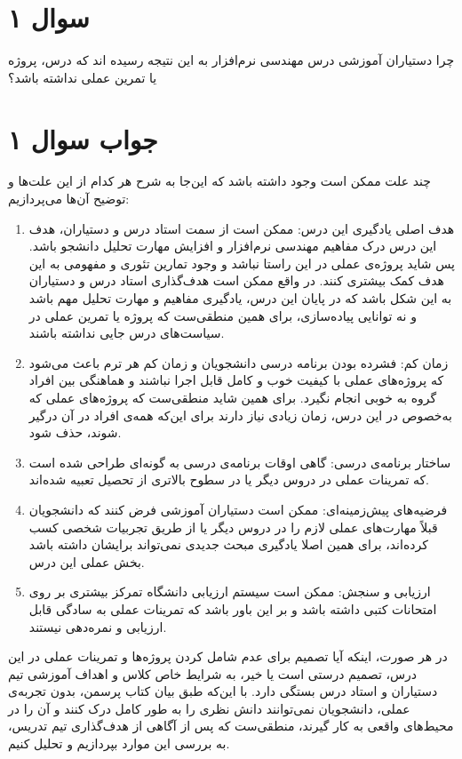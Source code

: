 \section*{سوال ۱}

چرا دستیاران آموزشی درس مهندسی نرم‌افزار به این نتیجه رسیده اند که درس، پروژه یا تمرین عملی نداشته باشد؟
\section*{جواب سوال ۱}

چند علت ممکن است وجود داشته باشد که این‌جا به شرح هر کدام از این علت‌ها و توضیح آن‌ها می‌پردازیم:

\begin{enumerate}
	\item هدف اصلی یادگیری این درس: ممکن است از سمت استاد درس و دستیاران، هدف این درس درک مفاهیم مهندسی نرم‌افزار و افزایش مهارت تحلیل دانشجو باشد. پس شاید پروژه‌ی عملی در این راستا نباشد و وجود تمارین تئوری و مفهومی به این هدف کمک بیشتری کنند. در واقع ممکن است هدف‌گذاری استاد درس و دستیاران به این شکل باشد که در پایان این درس، یادگیری مفاهیم و مهارت تحلیل مهم باشد و نه توانایی پیاده‌سازی، برای همین منطقی‌ست که پروژه یا تمرین عملی در سیاست‌های درس جایی نداشته باشند.
	
	\item زمان کم: فشرده بودن برنامه درسی دانشجویان و زمان کم هر ترم باعث می‌شود که پروژه‌های عملی با کیفیت خوب و کامل قابل اجرا نباشند و هماهنگی بین افراد گروه به خوبی انجام نگیرد. برای همین شاید منطقی‌ست که پروژه‌های عملی که به‌خصوص در این درس، زمان زیادی نیاز دارند برای این‌که همه‌ی افراد در آن درگیر شوند، حذف شود.
	
	\item ساختار برنامه‌ی درسی: گاهی اوقات برنامه‌ی درسی به گونه‌ای طراحی شده است که تمرینات عملی در دروس دیگر یا در سطوح بالاتری از تحصیل تعبیه شده‌اند.
	
	\item فرضیه‌های پیش‌زمینه‌ای: ممکن است دستیاران آموزشی فرض کنند که دانشجویان قبلاً مهارت‌های عملی لازم را در دروس دیگر یا از طریق تجربیات شخصی کسب کرده‌اند، برای همین اصلا یادگیری مبحث جدیدی نمی‌تواند برایشان داشته باشد بخش عملی این درس.
	
	\item ارزیابی و سنجش: ممکن است سیستم ارزیابی دانشگاه تمرکز بیشتری بر روی امتحانات کتبی داشته باشد و بر این باور باشد که تمرینات عملی به سادگی قابل ارزیابی و نمره‌دهی نیستند.
\end{enumerate}

در هر صورت، اینکه آیا تصمیم برای عدم شامل کردن پروژه‌ها و تمرینات عملی در این درس، تصمیم درستی است یا خیر، به شرایط خاص کلاس و اهداف آموزشی تیم دستیاران و استاد درس بستگی دارد. با این‌که طبق بیان کتاب پرسمن، بدون تجربه‌ی عملی، دانشجویان نمی‌توانند دانش نظری را به طور کامل درک کنند و آن را در محیط‌های واقعی به کار گیرند، منطقی‌ست که پس از آگاهی از هدف‌گذاری تیم تدریس، به بررسی این موارد بپردازیم و تحلیل کنیم.

